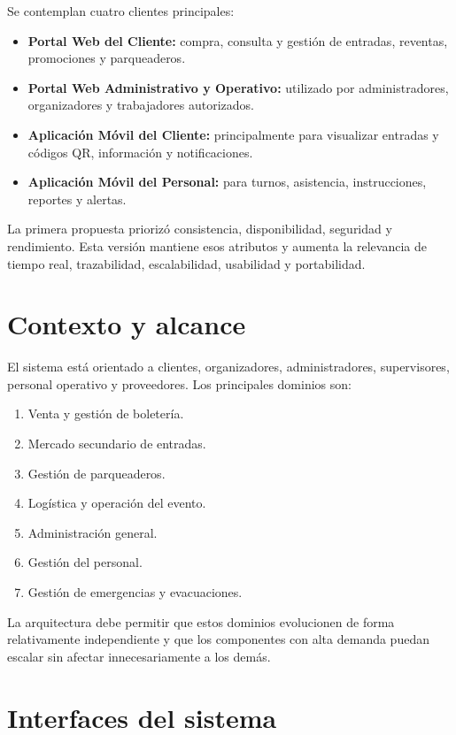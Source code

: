 \documentclass[12pt,a4paper]{article}
\begin{document}
Se contemplan cuatro clientes principales:

\begin{itemize}
\item \textbf{Portal Web del Cliente:} compra, consulta y gestión de entradas, reventas, promociones y parqueaderos.
\item \textbf{Portal Web Administrativo y Operativo:} utilizado por administradores, organizadores y trabajadores autorizados.
\item \textbf{Aplicación Móvil del Cliente:} principalmente para visualizar entradas y códigos QR, información y notificaciones.
\item \textbf{Aplicación Móvil del Personal:} para turnos, asistencia, instrucciones, reportes y alertas.
\end{itemize}

La primera propuesta priorizó consistencia, disponibilidad, seguridad y rendimiento. Esta versión mantiene esos atributos y aumenta la relevancia de tiempo real, trazabilidad, escalabilidad, usabilidad y portabilidad.

\section{Contexto y alcance}

El sistema está orientado a clientes, organizadores, administradores, supervisores, personal operativo y proveedores. Los principales dominios son:

\begin{enumerate}
\item Venta y gestión de boletería.
\item Mercado secundario de entradas.
\item Gestión de parqueaderos.
\item Logística y operación del evento.
\item Administración general.
\item Gestión del personal.
\item Gestión de emergencias y evacuaciones.
\end{enumerate}

La arquitectura debe permitir que estos dominios evolucionen de forma relativamente independiente y que los componentes con alta demanda puedan escalar sin afectar innecesariamente a los demás.

\section{Interfaces del sistema}
\end{document}
